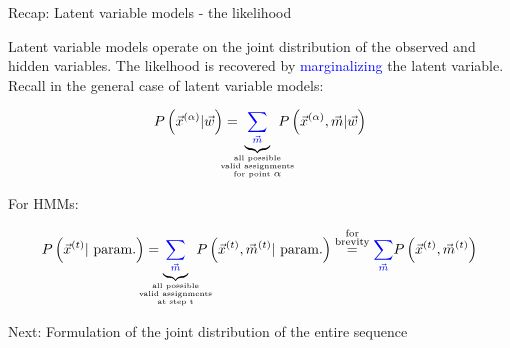 \begin{frame}{Recap: Latent variable models - the likelihood}

Latent variable models operate on the joint distribution of the observed and hidden variables.
The likelhood is recovered by \textcolor{blue}{marginalizing} the latent variable.
Recall in the general case of latent variable models:

\begin{equation}
P \left( \vec{x}^{(\alpha)} | \vec{w} \right) =
\kern-3.5ex
\underbrace{{\color{blue}\sum_{\vec{m}}}}_{
\substack{
\text{\tiny all possible}\\
\text{\tiny valid assignments}\\
\text{\tiny for point }\alpha}} 
\kern-3ex
P \left( \vec{x}^{(\alpha)}, \vec{m} | \vec{w} \right)
\end{equation}

\pause

\svspace{-5mm}

For HMMs:

\svspace{-5mm}

\begin{equation}
P \left( \vec{x}^{(t)} |~\text{param.} \right) =
\kern-4ex
\underbrace{{\color{blue}\sum_{\vec{m}}}}_{
\substack{
\text{\tiny all possible}\\
\text{\tiny valid assignments}\\
\text{\tiny at step t}
}
}
\kern-3ex
P \left( \vec{x}^{(t)}, \vec{m}^{(t)} |~\text{param.} \right)
\stackrel{\substack{\text{for}\\
\text{brevity}}}{=}
{\color{blue}\sum_{\vec{m}}}
P \left( \vec{x}^{(t)}, \vec{m}^{(t)} \right)
\end{equation}

\pause

Next: Formulation of the joint distribution of the entire sequence

\pause



\end{frame}

